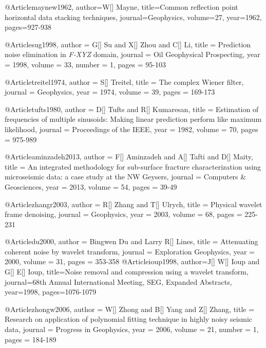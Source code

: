 @Article{maynew1962,
author={W[] Mayne},
title={Common reflection point horizontal data stacking techniques},
journal={Geophysics},
volume=27,
year=1962,
pages={927-938}
}

@Article{sug1998,
  author = 	 {G[] Su and X[] Zhou and C[] Li},
  title = 	 { Prediction noise elimination in \emph{F-XYZ} domain},
  journal = 	 { Oil Geophysical Prospecting},
  year = 	 1998,
  volume = 	 33,
  number = 	 1,
  pages = 	 {95-103}}

@Article{treitel1974,
  author = 	 {S[] Treitel},
  title = 	 {The complex Wiener filter},
  journal = 	 { Geophysics},
  year = 	 1974,
  volume = 	 39,
  pages = 	 {169-173}}

@Article{tufts1980,
  author = 	 {D[] Tufts and R[] Kumaresan},
  title = 	 {Estimation of frequencies of multiple sinusoids: Making linear prediction perform like maximum likelihood},
  journal = 	 { Proceedings of the IEEE},
  year = 	 1982,
  volume = 	 70,
  pages = 	 {975-989}}

@Article{aminzadeh2013,
  author = 	 {F[] Aminzadeh and A[] Tafti and D[] Maity},
  title = 	 {An integrated methodology for sub-surface fracture characterization using microseismic data: a case study at the NW {G}eysers},
  journal = 	 { Computers \& Geosciences},
  year = 	 2013,
  volume = 	 54,
  pages = 	 {39-49}}


@Article{zhangr2003,
  author = 	 {R[] Zhang and T[] Ulrych},
  title = 	 {Physical wavelet frame denoising},
  journal = 	 {Geophysics},
  year = 	 2003,
  volume = 	 68,
  pages = 	 {225-231}}

@Article{du2000,
  author = 	 {Bingwen Du and Larry R[] Lines},
  title = 	 {Attenuating coherent noise by wavelet transform},
  journal = 	 {Exploration Geophysics},
  year = 	 2000,
  volume = 	 31,
  pages = 	 {353-358}}
@Article{ioup1998,
  author={J[] W[] Ioup and G[] E[] Ioup},
  title={Noise removal and compression using a wavelet transform},
  journal={68th Annual International Meeting, SEG, Expanded Abstracts},
  year=1998,
  pages={1076-1079}
}









@Article{zhongw2006,
  author = 	 {W[] Zhong and B[] Yang and Z[] Zhang},
  title = 	 {Research on application of polynomial fitting technique in highly noisy seismic data},
  journal = 	 {Progress in Geophysics},
  year = 	 2006,
  volume = 	 21,
  number = 	 1,
  pages = 	 {184-189}}

